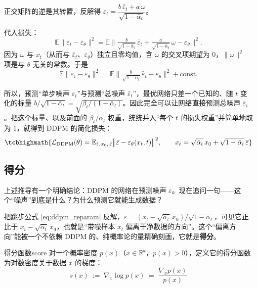 正交矩阵的逆是其转置，反解得 $\varepsilon_t = \dfrac{b\,\bar\varepsilon_t + a\,\omega}{\sqrt{1-\bar\alpha_t}}$。

代入损失：
\begin{equation}
\mathbb E\big\|\varepsilon_t-\varepsilon_\theta\big\|^2
= \mathbb E\Big\|\tfrac{b}{\sqrt{1-\bar\alpha_t}}\,\bar\varepsilon_t + \tfrac{a}{\sqrt{1-\bar\alpha_t}}\,\omega-\varepsilon_\theta\Big\|^2.
\end{equation}
因为 $\omega$ 与 $x_t$（从而与 $\bar\varepsilon_t$、$\varepsilon_\theta$）独立且零均值，含 $\omega$ 的交叉项期望为 $0$，$\|\omega\|^2$ 项是与 $\theta$ 无关的常数。于是
\begin{equation}
\mathbb E\big\|\varepsilon_t-\varepsilon_\theta\big\|^2
= \mathbb E\Big\|\tfrac{b}{\sqrt{1-\bar\alpha_t}}\,\bar\varepsilon_t-\varepsilon_\theta\Big\|^2 + \text{const}.
\end{equation}

所以，预测“单步噪声 $\varepsilon_t$”与预测“总噪声 $\bar\varepsilon_t$”，最优网络只差一个已知的、随 $t$ 变化的标量 $b/\sqrt{1-\bar\alpha_t}=\sqrt{\beta_t/(1-\bar\alpha_t)}$。因此完全可以让网络直接预测总噪声 $\bar\varepsilon_t$。把这个标量、以及前面的 $\beta_t/\alpha_t$ 权重，统统并入“每个 $t$ 的损失权重”并简单地取为 $1$，就得到 DDPM 的简化损失：
\begin{equation}
\tcbhighmath{
\mathcal L_{\text{DDPM}}(\theta)=\mathbb E_{t,\,x_0,\,\bar\varepsilon}\big\|\bar\varepsilon-\varepsilon_\theta(x_t,t)\big\|^2,
\qquad x_t=\sqrt{\bar\alpha_t}\,x_0+\sqrt{1-\bar\alpha_t}\,\bar\varepsilon}
\end{equation}

\subsection{得分}

上述推导有一个明确结论：DDPM 的网络在预测噪声 $\varepsilon$。现在追问一句——这个“噪声”到底是什么？为什么预测它就能生成数据？

把跳步公式 \eqref{eq:ddpm_reparam} 反解，$\varepsilon = (x_t - \sqrt{\bar\alpha_t}\,x_0)/\sqrt{1-\bar\alpha_t}$，可见它正比于 $x_t - \sqrt{\bar\alpha_t}\,x_0$，也就是“带噪样本 $x_t$ 偏离干净数据的方向”。这个“偏离方向”能被一个不依赖 DDPM 的、纯概率论的量精确刻画，它就是\textbf{得分}。

\begin{definition}{得分函数}{score}
对一个概率密度 $p(x)$（$x \in \mathbb{R}^d$，$p(x) > 0$），定义它的得分函数为对数密度关于数据 $x$ 的梯度：
\begin{equation}\label{eq:score_def}
s(x) \;:=\; \nabla_x \log p(x) \;=\; \frac{\nabla_x p(x)}{p(x)}
\end{equation}
\end{definition}

